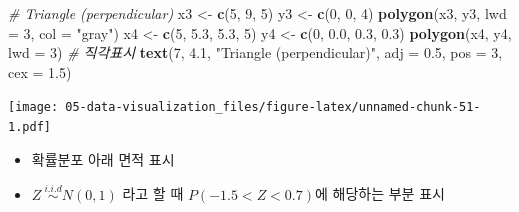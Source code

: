 \documentclass[
  11pt,
]{krantz}
\newenvironment{Shaded}{\begin{snugshade}}{\end{snugshade}}
\newcommand{\CommentTok}[1]{\textcolor[rgb]{0.37,0.37,0.37}{\textit{#1}}}
\newcommand{\DataTypeTok}[1]{\textcolor[rgb]{0.27,0.27,0.27}{#1}}
\newcommand{\DecValTok}[1]{\textcolor[rgb]{0.06,0.06,0.06}{#1}}
\newcommand{\FloatTok}[1]{\textcolor[rgb]{0.06,0.06,0.06}{#1}}
\newcommand{\KeywordTok}[1]{\textcolor[rgb]{0.27,0.27,0.27}{\textbf{#1}}}
\newcommand{\NormalTok}[1]{#1}
\newcommand{\StringTok}[1]{\textcolor[rgb]{0.5,0.5,0.5}{#1}}
\providecommand{\tightlist}{%
  \setlength{\itemsep}{0pt}\setlength{\parskip}{0pt}}
\begin{document}
\begin{Shaded}
\begin{Highlighting}[]
\CommentTok{# Triangle (perpendicular)}
\NormalTok{x3 <-}\StringTok{ }\KeywordTok{c}\NormalTok{(}\DecValTok{5}\NormalTok{, }\DecValTok{9}\NormalTok{, }\DecValTok{5}\NormalTok{)}
\NormalTok{y3 <-}\StringTok{ }\KeywordTok{c}\NormalTok{(}\DecValTok{0}\NormalTok{, }\DecValTok{0}\NormalTok{, }\DecValTok{4}\NormalTok{)}
\KeywordTok{polygon}\NormalTok{(x3, y3, }\DataTypeTok{lwd =} \DecValTok{3}\NormalTok{, }\DataTypeTok{col =} \StringTok{"gray"}\NormalTok{)}
\NormalTok{x4 <-}\StringTok{ }\KeywordTok{c}\NormalTok{(}\DecValTok{5}\NormalTok{, }\FloatTok{5.3}\NormalTok{, }\FloatTok{5.3}\NormalTok{, }\DecValTok{5}\NormalTok{)}
\NormalTok{y4 <-}\StringTok{ }\KeywordTok{c}\NormalTok{(}\DecValTok{0}\NormalTok{, }\FloatTok{0.0}\NormalTok{, }\FloatTok{0.3}\NormalTok{, }\FloatTok{0.3}\NormalTok{)}
\KeywordTok{polygon}\NormalTok{(x4, y4, }\DataTypeTok{lwd =} \DecValTok{3}\NormalTok{) }\CommentTok{# 직각표시}
\KeywordTok{text}\NormalTok{(}\DecValTok{7}\NormalTok{, }\FloatTok{4.1}\NormalTok{, }\StringTok{"Triangle (perpendicular)"}\NormalTok{, }\DataTypeTok{adj =} \FloatTok{0.5}\NormalTok{, }\DataTypeTok{pos =} \DecValTok{3}\NormalTok{, }\DataTypeTok{cex =} \FloatTok{1.5}\NormalTok{)}
\end{Highlighting}
\end{Shaded}

\texttt{[image: 05-data-visualization\_files/figure-latex/unnamed-chunk-51-1.pdf]}

\normalsize

\begin{itemize}
\tightlist
\item
  확률분포 아래 면적 표시
\item
  \(Z ~ \stackrel{i.i.d}{\sim} N(0, 1)\) 라고 할 때 \(P(-1.5 < Z < 0.7)\)에 해당하는 부분 표시
\end{itemize}

\footnotesize
\end{document}

